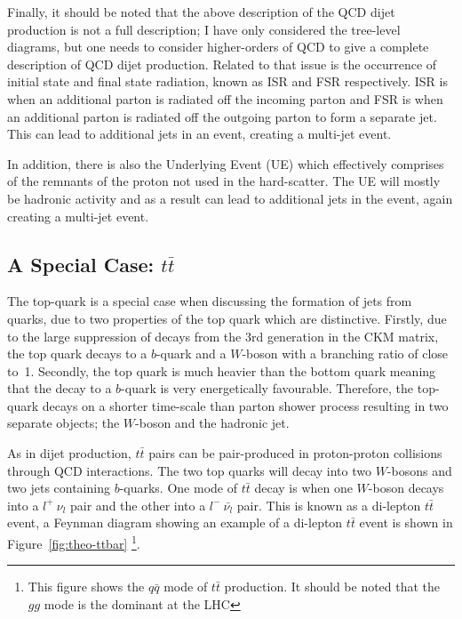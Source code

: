 Finally, it should be noted that the above description of the QCD dijet production is not a full description;
I have only considered the tree-level diagrams, 
but one needs to consider higher-orders of QCD to give a complete description of QCD dijet production.
Related to that issue is the occurrence of initial state and final state radiation, known as ISR and FSR respectively.
ISR is when an additional parton is radiated off the incoming parton and FSR is when an additional parton is radiated off the outgoing parton to form a separate jet.
This can lead to additional jets in an event, creating a multi-jet event.

In addition, there is also the Underlying Event (UE) which effectively comprises of the remnants of the proton not used in the hard-scatter.
The UE will mostly be hadronic activity and as a result can lead to additional jets in the event, again creating a multi-jet event.

\subsection{A Special Case: $t\bar{t}$}
\label{sec:theo-ttbar}

The top-quark is a special case when discussing the formation of jets from quarks,
due to two properties of the top quark which are distinctive.
Firstly, due to the large suppression of decays from the 3rd generation in the CKM matrix,
the top quark decays to a $b$-quark and a $W$-boson with a branching ratio of close to~1.
Secondly, the top quark is much heavier than the bottom quark
meaning that the decay to a $b$-quark is very energetically favourable.
Therefore, the top-quark decays on a shorter time-scale than parton shower process
resulting in two separate objects; the $W$-boson and the hadronic jet.

As in dijet production, $t\bar{t}$ pairs can be pair-produced in proton-proton collisions through QCD interactions.
The two top quarks will decay into two $W$-bosons and two jets containing $b$-quarks.
One mode of $t\bar{t}$ decay is when one $W$-boson decays into a $l^+~\nu_l$ pair and the other into a $l^{-}~\bar{\nu_l}$ pair.
This is known as a di-lepton $t\bar{t}$ event, a Feynman diagram showing an example of a di-lepton $t\bar{t}$ event is shown in
Figure~\ref{fig:theo-ttbar} \footnote{ This figure shows the $q\bar{q}$ mode of $t\bar{t}$ production. It should be noted that the $gg$ mode is the dominant at the LHC}.

